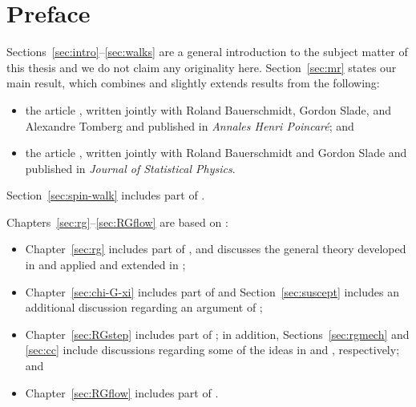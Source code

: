 \cleardoublepage

\chapter{Preface}

Sections~\ref{sec:intro}--\ref{sec:walks} are a general introduction to the
subject matter of this thesis and we do not claim any originality here. Section~\ref{sec:mr}
states our main result, which combines and slightly extends results from the following:
\begin{itemize}
\item
the article \cite{BSTW-clp}, written jointly with
Roland Bauerschmidt, Gordon Slade, and Alexandre Tomberg and
published in \textit{Annales Henri Poincar\'{e}};
and

\item
the article \cite{BSW-saw-sa}, written jointly with
Roland Bauerschmidt and Gordon Slade and published
in \textit{Journal of Statistical Physics}.
\end{itemize}
Section~\ref{sec:spin-walk} includes part of \cite{BSW-saw-sa}.

Chapters~\ref{sec:rg}--\ref{sec:RGflow} are based on \cite{BSTW-clp,BSW-saw-sa}:
\begin{itemize}
\item
Chapter~\ref{sec:rg} includes part of \cite{BSTW-clp,BSW-saw-sa},
and discusses the general theory developed in
\cite{BS-rg-norm,BS-rg-loc,BBS-rg-pt,BS-rg-IE,BS-rg-step}
and applied and extended in
\cite{BBS-saw4-log,BBS-saw4,ST-phi4};

\item
Chapter~\ref{sec:chi-G-xi} includes part of \cite{BSTW-clp,BSW-saw-sa}
and Section~\ref{sec:suscept} includes an additional discussion regarding an argument
of \cite{BBS-saw4-log};

\item
Chapter~\ref{sec:RGstep} includes part of \cite{BSTW-clp}; in addition,
Sections~\ref{sec:rgmech} and \ref{sec:cc} include discussions regarding some of the ideas in
\cite{BS-rg-step} and \cite{BS-rg-loc}, respectively; and

\item
Chapter~\ref{sec:RGflow} includes part of \cite{BSW-saw-sa}.
\end{itemize}

\cleardoublepage

\tableofcontents                %

\cleardoublepage

